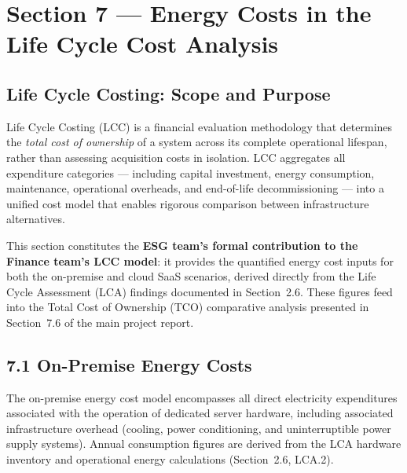 

\chapter{Section 7 --- Energy Costs in the Life Cycle Cost Analysis}

\section{Life Cycle Costing: Scope and Purpose}

Life Cycle Costing (LCC) is a financial evaluation methodology that
determines the \textit{total cost of ownership} of a system across its
complete operational lifespan, rather than assessing acquisition costs in
isolation. LCC aggregates all expenditure categories --- including capital
investment, energy consumption, maintenance, operational overheads, and
end-of-life decommissioning --- into a unified cost model that enables
rigorous comparison between infrastructure alternatives.

This section constitutes the \textbf{ESG team's formal contribution to the
Finance team's LCC model}: it provides the quantified energy cost inputs
for both the on-premise and cloud SaaS scenarios, derived directly from the
Life Cycle Assessment (LCA) findings documented in Section~2.6. These
figures feed into the Total Cost of Ownership (TCO) comparative analysis
presented in Section~7.6 of the main project report.

\section{7.1 On-Premise Energy Costs}

The on-premise energy cost model encompasses all direct electricity
expenditures associated with the operation of dedicated server hardware,
including associated infrastructure overhead (cooling, power conditioning,
and uninterruptible power supply systems). Annual consumption figures are
derived from the LCA hardware inventory and operational energy calculations
(Section~2.6, LCA.2).

